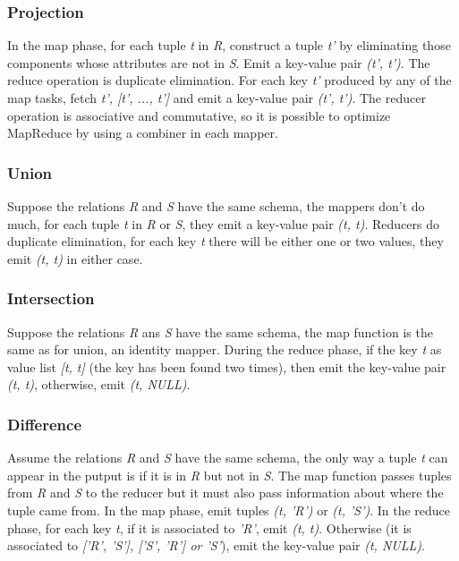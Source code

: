 		\subsubsection{Projection}
			\par
			In the map phase, for each tuple \textit{t} in \textit{R}, construct a tuple \textit{t'} by eliminating those components whose attributes are not in \textit{S}. Emit a key-value pair \textit{(t', t')}.
			\newline
			The reduce operation is duplicate elimination. For each key \textit{t'} produced by any of the map tasks, fetch \textit{t', [t', ..., t']} and emit a key-value pair \textit{(t', t')}.
			\newline
			The reducer operation is associative and commutative, so it is possible to optimize MapReduce by using a combiner in each mapper.
		\subsubsection{Union}
			\par
			Suppose the relations \textit{R} and \textit{S} have the same schema, the mappers don't do much, for each tuple \textit{t} in \textit{R} or \textit{S}, they emit a key-value pair \textit{(t, t)}.
			\newline
			Reducers do duplicate elimination, for each key \textit{t} there will be either one or two values, they emit \textit{(t, t)} in either case.
		\subsubsection{Intersection}
			\par
			Suppose the relations \textit{R} ans \textit{S} have the same schema, the map function is the same as for union, an identity mapper. During the reduce phase, if the key \textit{t} as value list \textit{[t, t]} (the key has been found two times), then emit the key-value pair \textit{(t, t)}, otherwise, emit \textit{(t, NULL)}.
		\subsubsection{Difference}
			\par
			Assume the relations \textit{R} and \textit{S} have the same schema, the only way a tuple \textit{t} can appear in the putput is if it is in \textit{R} but not in \textit{S}. The map function passes tuples from \textit{R} and \textit{S} to the reducer but it must also pass information about where the tuple came from.
			\newline
			In the map phase, emit tuples \textit{(t, 'R')} or \textit{(t, 'S')}.
			\newline
			In the reduce phase, for each key \textit{t}, if it is associated to \textit{'R'}, emit \textit{(t, t)}. Otherwise (it is associated to \textit{['R', 'S'], ['S', 'R'] or 'S'}), emit the key-value pair \textit{(t, NULL)}.
